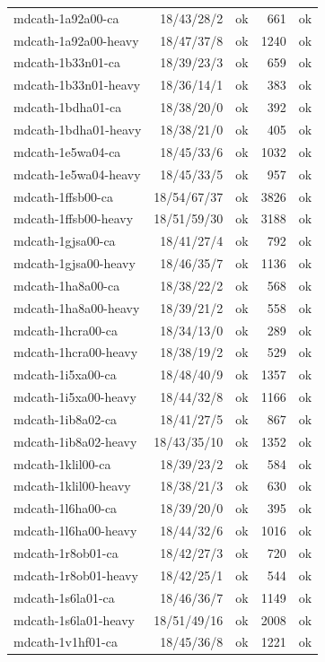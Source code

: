 \begin{small}
\begin{longtable}{lrlrl}
mdcath-1a92a00-ca & 18/43/28/2 & ok & 661 & ok\\
mdcath-1a92a00-heavy & 18/47/37/8 & ok & 1240 & ok\\
mdcath-1b33n01-ca & 18/39/23/3 & ok & 659 & ok\\
mdcath-1b33n01-heavy & 18/36/14/1 & ok & 383 & ok\\
mdcath-1bdha01-ca & 18/38/20/0 & ok & 392 & ok\\
mdcath-1bdha01-heavy & 18/38/21/0 & ok & 405 & ok\\
mdcath-1e5wa04-ca & 18/45/33/6 & ok & 1032 & ok\\
mdcath-1e5wa04-heavy & 18/45/33/5 & ok & 957 & ok\\
mdcath-1ffsb00-ca & 18/54/67/37 & ok & 3826 & ok\\
mdcath-1ffsb00-heavy & 18/51/59/30 & ok & 3188 & ok\\
mdcath-1gjsa00-ca & 18/41/27/4 & ok & 792 & ok\\
mdcath-1gjsa00-heavy & 18/46/35/7 & ok & 1136 & ok\\
mdcath-1ha8a00-ca & 18/38/22/2 & ok & 568 & ok\\
mdcath-1ha8a00-heavy & 18/39/21/2 & ok & 558 & ok\\
mdcath-1hcra00-ca & 18/34/13/0 & ok & 289 & ok\\
mdcath-1hcra00-heavy & 18/38/19/2 & ok & 529 & ok\\
mdcath-1i5xa00-ca & 18/48/40/9 & ok & 1357 & ok\\
mdcath-1i5xa00-heavy & 18/44/32/8 & ok & 1166 & ok\\
mdcath-1ib8a02-ca & 18/41/27/5 & ok & 867 & ok\\
mdcath-1ib8a02-heavy & 18/43/35/10 & ok & 1352 & ok\\
mdcath-1klil00-ca & 18/39/23/2 & ok & 584 & ok\\
mdcath-1klil00-heavy & 18/38/21/3 & ok & 630 & ok\\
mdcath-1l6ha00-ca & 18/39/20/0 & ok & 395 & ok\\
mdcath-1l6ha00-heavy & 18/44/32/6 & ok & 1016 & ok\\
mdcath-1r8ob01-ca & 18/42/27/3 & ok & 720 & ok\\
mdcath-1r8ob01-heavy & 18/42/25/1 & ok & 544 & ok\\
mdcath-1s6la01-ca & 18/46/36/7 & ok & 1149 & ok\\
mdcath-1s6la01-heavy & 18/51/49/16 & ok & 2008 & ok\\
mdcath-1v1hf01-ca & 18/45/36/8 & ok & 1221 & ok\\

\end{longtable}
\end{small}
